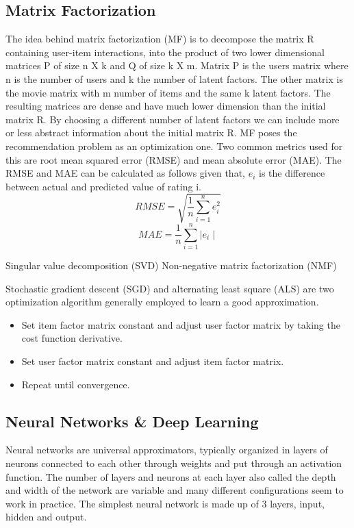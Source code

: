 \subsection{Matrix Factorization}
The idea behind matrix factorization (MF) is to decompose the matrix R containing user-item interactions, into the product of two lower dimensional matrices P of size n X k and Q of size k X m. Matrix P is the users matrix where n is the number of users and k the number of latent factors. The other matrix is the movie matrix with m number of items and the same k latent factors.
The resulting matrices are dense and have much lower dimension than the initial matrix R. By choosing a different number of latent factors we can include more or less abstract information about the initial matrix R. MF poses the recommendation problem as an optimization one. Two common metrics used for this are root mean squared error (RMSE) and mean absolute error (MAE). The RMSE and MAE can be calculated as follows given that, \(e_i\) is the difference between actual and predicted value of rating i. 
\begin{equation}
    RMSE = \sqrt{\frac{1}{n}\sum_{i=1}^{n}{e^2_i}}
\end{equation}
\begin{equation}
    MAE = \frac{1}{n}\sum_{i=1}^{n}{\mid e_i\mid}
\end{equation}

Singular value decomposition (SVD)
Non-negative matrix factorization (NMF)

Stochastic gradient descent (SGD) and alternating least square (ALS) are two optimization algorithm generally employed to learn a good approximation.


\begin{itemize}
    \item Set item factor matrix constant and adjust user factor matrix by taking the cost function derivative.
    \item Set user factor matrix constant and adjust item factor matrix.
    \item Repeat until convergence.
\end{itemize}

\subsection{Neural Networks \& Deep Learning}
Neural networks are universal approximators, typically organized in layers of neurons connected to each other through weights and put through an activation function. The number of layers and neurons at each layer also called the depth and width of the network are variable and many different configurations seem to work in practice. The simplest neural network is made up of 3 layers, input, hidden and output.

